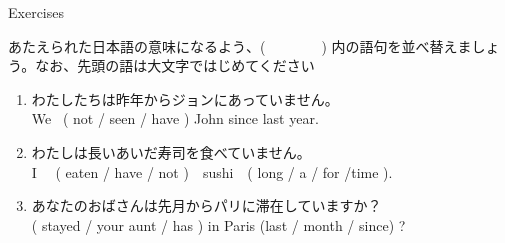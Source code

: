\documentclass[aspectratio=169,xcolor={dvipsnames,table}]{beamer}
\newcommand{\myaudio}[1]{\href{#1}{\faVolumeUp}}
\begin{document}
\begin{frame}[plain]{Exercises}
 
あたえられた日本語の意味になるよう、(~~~~~~~~) 内の語句を並べ替えましょう。なお、先頭の語は大文字ではじめてください\mbox{}\hfill{\scriptsize \myaudio{./audio/012_have_pp_keizoku_09.mp3}}


\begin{enumerate}
 \item {\small わたしたちは昨年からジョンにあっていません。}\\
We  ~( not / seen / have ) John since last year.\\
 \item  {\small わたしは長いあいだ寿司を食べていません。\\
I ~~( eaten /  have / not )~~sushi~~( }long / a / for /time ).\\
 \item  {\small あなたのおばさんは先月からパリに滞在していますか}？\bcdfrance\\
( stayed /  your aunt / has ) in Paris (last / month / since) ? \\
\end{enumerate}
\end{frame}
\end{document}
